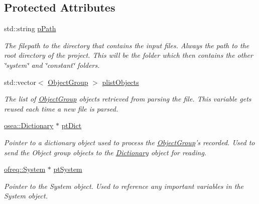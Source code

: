 \subsection*{Protected Attributes}
\begin{DoxyCompactItemize}
\item 
std\-::string \hyperlink{classosea_1_1_file_reader_adbc50f785e7fbbcbcf79af0f3bee49de}{p\-Path}
\begin{DoxyCompactList}\small\item\em The filepath to the directory that contains the input files. Always the path to the root directory of the project. This will be the folder which then contains the other \char`\"{}system\char`\"{} and \char`\"{}constant\char`\"{} folders. \end{DoxyCompactList}\item 
std\-::vector$<$ \hyperlink{classosea_1_1_object_group}{Object\-Group} $>$ \hyperlink{classosea_1_1_file_reader_a1b16c3fe97f09ef7bb15bd56b3831bf9}{plist\-Objects}
\begin{DoxyCompactList}\small\item\em The list of \hyperlink{classosea_1_1_object_group}{Object\-Group} objects retrieved from parsing the file. This variable gets reused each time a new file is parsed. \end{DoxyCompactList}\item 
\hyperlink{classosea_1_1_dictionary}{osea\-::\-Dictionary} $\ast$ \hyperlink{classosea_1_1_file_reader_a0a741388f68dbb79e3e57797e90f42f4}{pt\-Dict}
\begin{DoxyCompactList}\small\item\em Pointer to a dictionary object used to process the \hyperlink{classosea_1_1_object_group}{Object\-Group}'s recorded. Used to send the Object group objects to the \hyperlink{classosea_1_1_dictionary}{Dictionary} object for reading. \end{DoxyCompactList}\item 
\hyperlink{classosea_1_1ofreq_1_1_system}{ofreq\-::\-System} $\ast$ \hyperlink{classosea_1_1_file_reader_ae584ddecd770e251978141a152d434ac}{pt\-System}
\begin{DoxyCompactList}\small\item\em Pointer to the System object. Used to reference any important variables in the System object. \end{DoxyCompactList}\end{DoxyCompactItemize}
